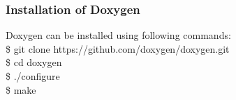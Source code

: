 \subsubsection{Installation of Doxygen}
Doxygen can be installed using following commands:\\

\hspace{4pt} \$ git clone https://github.com/doxygen/doxygen.git\\ 

\hspace{4pt} \$ cd doxygen\\

\hspace{4pt} \$ ./configure\\

\hspace{4pt} \$ make \\


